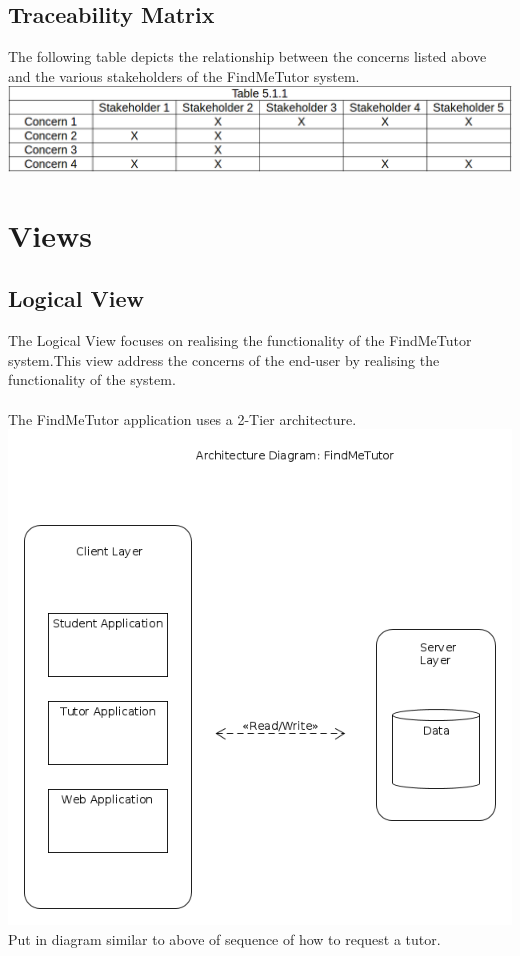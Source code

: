 \documentclass[12pt]{article}
\begin{document}
\subsection{Traceability Matrix}
The following table depicts the relationship between the concerns listed above and the various stakeholders of the FindMeTutor system.\\
\includegraphics[width=140mm]{./trace.png}

\section{Views}

\subsection{Logical View}
The Logical View focuses on realising the functionality of the FindMeTutor system.This view address the concerns of the end-user by realising the functionality of the system.\\\\
The FindMeTutor application uses a 2-Tier architecture.\\
\includegraphics[width=140mm]{./architecture_diagram.png}
Put in diagram similar to above of sequence of how to request a tutor.\\
\end{document}
